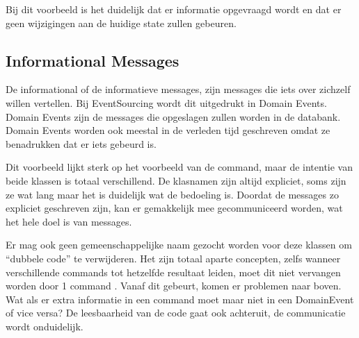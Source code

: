 
Bij dit voorbeeld is het duidelijk dat er informatie opgevraagd wordt en dat er geen wijzigingen aan de huidige state zullen gebeuren.

\subsection{Informational Messages}
\label{subsec:informational-messages}

De informational of de informatieve messages, zijn messages die iets over zichzelf willen vertellen. Bij EventSourcing wordt dit uitgedrukt in Domain Events. Domain Events zijn de messages die opgeslagen zullen worden in de databank. Domain Events worden ook meestal in de verleden tijd geschreven omdat ze benadrukken dat er iets gebeurd is.


Dit voorbeeld lijkt sterk op het voorbeeld van de \Gls{command}, maar de intentie van beide klassen is totaal verschillend. De klasnamen zijn altijd expliciet, soms zijn ze wat lang maar het is duidelijk wat de bedoeling is. Doordat de messages zo expliciet geschreven zijn, kan er gemakkelijk mee gecommuniceerd worden, wat het hele doel is van messages.

Er mag ook geen gemeenschappelijke naam gezocht worden voor deze klassen om ``dubbele code'' te verwijderen. Het zijn totaal aparte concepten, zelfs wanneer verschillende \Glspl{command} tot hetzelfde resultaat leiden, moet dit niet vervangen worden door 1 \Gls{command} \autocite{Verraes2014DDDLinguistic}. Vanaf dit gebeurt, komen er problemen naar boven. Wat als er extra informatie in een \Gls{command} moet maar niet in een DomainEvent of vice versa? De leesbaarheid van de code gaat ook achteruit, de communicatie wordt onduidelijk.
